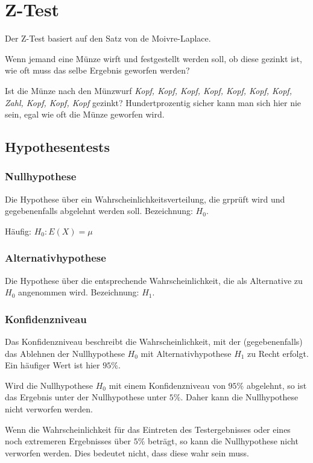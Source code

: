 \chapter{Z-Test}

Der Z-Test basiert auf den Satz von de Moivre-Laplace. 

Wenn jemand eine Münze wirft und festgestellt werden soll, ob diese gezinkt ist, wie oft muss das selbe Ergebnis geworfen werden?

Ist die Münze nach den Münzwurf \textit{Kopf, Kopf, Kopf, Kopf, Kopf, Kopf, Kopf, Zahl, Kopf, Kopf, Kopf} gezinkt? Hundertprozentig sicher kann man sich hier nie sein, egal wie oft die Münze geworfen wird.

\section{Hypothesentests}

\subsection{Nullhypothese}

Die Hypothese über ein Wahrscheinlichkeitsverteilung, die grprüft wird und gegebenenfalls abgelehnt werden soll. Bezeichnung: $H_0$.

Häufig: $H_0: E(X) = \mu$

\subsection{Alternativhypothese}

Die Hypothese über die entsprechende Wahrscheinlichkeit, die als Alternative zu $H_0$ angenommen wird. Bezeichnung: $H_1$.

\subsection{Konfidenzniveau}

Das Konfidenzniveau beschreibt die Wahrscheinlichkeit, mit der (gegebenenfalls) das Ablehnen der Nullhypothese $H_0$ mit Alternativhypothese $H_1$ zu Recht erfolgt. Ein häufiger Wert ist hier $95\%$.

Wird die Nullhypothese $H_0$ mit einem Konfidenzniveau von $95\%$ abgelehnt, so ist das Ergebnis unter der Nullhypothese unter $5\%$. Daher kann die Nullhypothese nicht verworfen werden.

Wenn die Wahrscheinlichkeit für das Eintreten des Testergebnisses oder eines noch extremeren Ergebnisses über $5\%$ beträgt, so kann die Nullhypothese nicht verworfen werden. Dies bedeutet nicht, dass diese wahr sein muss.

